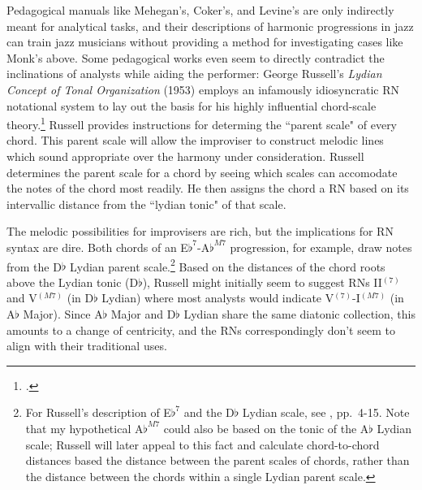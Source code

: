 Pedagogical manuals like Mehegan's, Coker's, and Levine's are only indirectly meant for analytical tasks, and their descriptions of harmonic progressions in jazz can train jazz musicians without providing a method for investigating cases like Monk's above.  Some pedagogical works even seem to directly contradict the inclinations of analysts while aiding the performer: George Russell's \emph{Lydian Concept of Tonal Organization} (1953) employs an infamously idiosyncratic RN notational system to lay out the basis for his highly influential chord-scale theory.\footnote{\cite{russell1953}.}  Russell provides instructions for determing the ``parent scale" of every chord.  This parent scale will allow the improviser to construct melodic lines which sound appropriate over the harmony under consideration.  Russell determines the parent scale for a chord by seeing which scales can accomodate the notes of the chord most readily.  He then assigns the chord a RN based on its intervallic distance from the ``lydian tonic" of that scale.

The melodic possibilities for improvisers are rich, but the implications for RN syntax are dire.  Both chords of an E$\flat ^7$-A$\flat^{M7}$ progression, for example, draw notes from the D$\flat$ Lydian parent scale.\footnote{For Russell's description of E$\flat^7$ and the D$\flat$ Lydian scale, see \cite{russell1953}, pp.\ 4-15.  Note that my hypothetical A$\flat^{M7}$ could also be based on the tonic of the A$\flat$ Lydian scale; Russell will later appeal to this fact and calculate chord-to-chord distances based the distance between the parent scales of chords, rather than the distance between the chords within a single Lydian parent scale.}  Based on the distances of the chord roots above the Lydian tonic (D$\flat$), Russell might initially seem to suggest RNs II$^{(7)}$ and V$^{(M7)}$ (in D$\flat$ Lydian) where most analysts would indicate V$^{(7)}$-I$^{(M7)}$ (in A$\flat$ Major).  Since A$\flat$ Major and D$\flat$ Lydian share the same diatonic collection, this amounts to a change of centricity, and the RNs correspondingly don't seem to align with their traditional uses.


